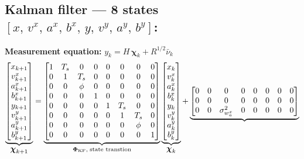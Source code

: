 \documentclass[12pt, a4paper]{article}
\begin{document}
\subsection*{Kalman filter --- 8 states $[x,\,v^x,\,a^x,\,b^x,\,y,\,v^y,\,a^y,\,b^y]$:}
\textbf{Measurement equation:}
$y_k = H\,\boldsymbol{\chi}_k + R^{1/2}\bar{\nu}_k$
\vspace{-0.3cm}
\[
\underbrace{
\begin{bmatrix} x_{k+1} \\ v^x_{k+1} \\ a^x_{k+1} \\ b^x_{k+1} \\ y_{k+1} \\ v^y_{k+1} \\ a^y_{k+1} \\ b^y_{k+1} \end{bmatrix}
}_{\displaystyle\boldsymbol{\chi}_{k+1}}
=
\underbrace{
\begin{bmatrix}
  1 & T_s & 0   & 0 & 0 & 0  & 0   & 0 \\
  0 & 1   & T_s & 0 & 0 & 0  & 0   & 0 \\
  0 & 0   & \phi& 0 & 0 & 0  & 0   & 0 \\
  0 & 0   & 0   & 1 & 0 & 0  & 0   & 0 \\
  0 & 0   & 0   & 0 & 1 & T_s& 0   & 0 \\
  0 & 0   & 0   & 0 & 0 & 1  & T_s & 0 \\
  0 & 0   & 0   & 0 & 0 & 0  & \phi& 0 \\
  0 & 0   & 0   & 0 & 0 & 0  & 0   & 1
\end{bmatrix}
}_{\boldsymbol{\Phi}_{\text{KF}},\;{\scriptsize\text{state transtion}}}
\underbrace{
\begin{bmatrix} x_k \\ v^x_k \\ a^x_k \\ b^x_k \\ y_k \\ v^y_k \\ a^y_k \\ b^y_k \end{bmatrix}
}_{\displaystyle\boldsymbol{\chi}_k}
+
\underbrace{
\begin{bmatrix}
  0 & 0 & 0              & 0              & 0 & 0 & 0              & 0             \\
  0 & 0 & 0              & 0              & 0 & 0 & 0              & 0             \\
  0 & 0 & \sigma_{w_a^x}^2 & 0            & 0 & 0 & 0              & 0             \\

\end{bmatrix}}\]
\end{document}
